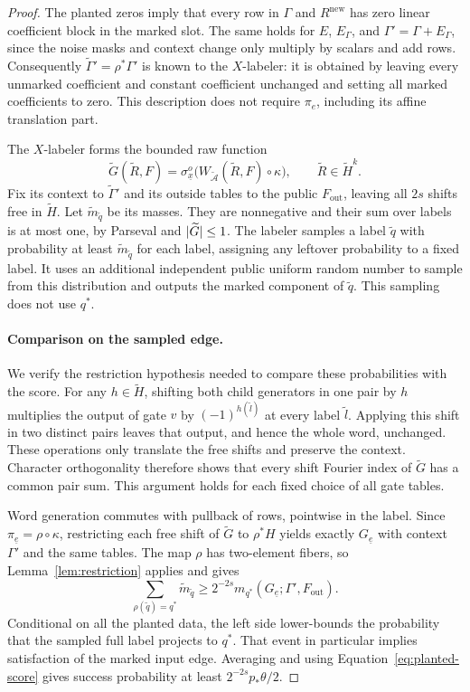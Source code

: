 \begin{proof}
The planted zeros imply that every row in $\Gamma$ and
$R^{\mathrm{new}}$ has zero linear coefficient block in the marked slot.
The same holds for $E$, $E_\Gamma$, and
$\Gamma'=\Gamma+E_\Gamma$, since the noise masks and context change
only multiply by scalars and add rows.  Consequently
$\widetilde\Gamma'=\rho^*\Gamma'$ is known to the $X$-labeler:
it is obtained by leaving every unmarked coefficient and constant
coefficient unchanged and setting all marked coefficients to zero.
This description does not require $\pi_e$, including its affine
translation part.

The $X$-labeler forms the bounded raw function
\[
 \widetilde G(\widetilde R,F)
 =\sigma^o_{\underline x}
   \bigl(W_{\widetilde{\mathcal A}}(\widetilde R,F)
                \circ\kappa\bigr),
 \qquad \widetilde R\in\widetilde H^k.
\]
Fix its context to $\widetilde\Gamma'$ and its outside tables to
the public $F_{\mathrm{out}}$, leaving all $2s$ shifts free in
$\widetilde H$.  Let
$\widetilde m_{\widetilde q}$ be its masses.  They are nonnegative
and their sum over labels is at most one, by Parseval and
$\lvert\widetilde G\rvert\leq1$.  The labeler samples a label
$\widetilde q$ with probability at least
$\widetilde m_{\widetilde q}$ for each label, assigning any leftover
probability to a fixed label.  It uses an additional independent
public uniform random number to sample from this distribution and
outputs the marked component of $\widetilde q$.  This sampling does
not use $q^*$.

\paragraph{Comparison on the sampled edge.}
We verify the restriction hypothesis needed to compare these
probabilities with the score.  For any $h\in\widetilde H$, shifting
both child generators in one pair by $h$ multiplies the output
of gate $v$ by $(-1)^{h(\widetilde l)}$ at every label
$\widetilde l$.  Applying this shift in two distinct pairs leaves
that output, and hence the whole word, unchanged.  These operations
only translate the free shifts and preserve the context.
Character orthogonality therefore shows that every shift Fourier
index of $\widetilde G$ has a common pair sum.  This argument holds
for each fixed choice of all gate tables.

Word generation commutes with pullback of rows, pointwise in the
label.  Since $\pi_{\underline e}=\rho\circ\kappa$, restricting
each free shift of $\widetilde G$ to $\rho^*H$ yields exactly
$G_{\underline e}$ with context $\Gamma'$ and the same tables.
The map $\rho$ has two-element fibers, so Lemma~\ref{lem:restriction}
applies and gives
\[
 \sum_{\rho(\widetilde q)=q^*}\widetilde m_{\widetilde q}
 \geq 2^{-2s}
 m_{q^*}(G_{\underline e};\Gamma',F_{\mathrm{out}}).
\]
Conditional on all the planted data, the left side lower-bounds
the probability that the sampled full label projects to $q^*$.
That event in particular implies satisfaction of the marked
input edge.  Averaging and using Equation~\eqref{eq:planted-score}
gives success probability at least $2^{-2s}p_*\theta/2$.


\end{proof}
